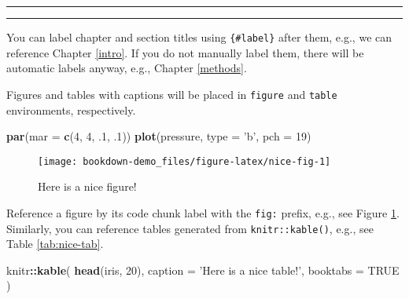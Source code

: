 \documentclass[]{book}
\newenvironment{Shaded}{\begin{snugshade}}{\end{snugshade}}
\newcommand{\DataTypeTok}[1]{\textcolor[rgb]{0.13,0.29,0.53}{#1}}
\newcommand{\DecValTok}[1]{\textcolor[rgb]{0.00,0.00,0.81}{#1}}
\newcommand{\FloatTok}[1]{\textcolor[rgb]{0.00,0.00,0.81}{#1}}
\newcommand{\KeywordTok}[1]{\textcolor[rgb]{0.13,0.29,0.53}{\textbf{#1}}}
\newcommand{\NormalTok}[1]{#1}
\newcommand{\OperatorTok}[1]{\textcolor[rgb]{0.81,0.36,0.00}{\textbf{#1}}}
\newcommand{\OtherTok}[1]{\textcolor[rgb]{0.56,0.35,0.01}{#1}}
\newcommand{\StringTok}[1]{\textcolor[rgb]{0.31,0.60,0.02}{#1}}
\theoremstyle{definition}
\theoremstyle{definition}
\theoremstyle{definition}
\theoremstyle{remark}
\begin{document}
\begin{center}\rule{0.5\linewidth}{\linethickness}\end{center}

\begin{center}\rule{0.5\linewidth}{\linethickness}\end{center}

You can label chapter and section titles using \texttt{\{\#label\}}
after them, e.g., we can reference Chapter \ref{intro}. If you do not
manually label them, there will be automatic labels anyway, e.g.,
Chapter \ref{methods}.

Figures and tables with captions will be placed in \texttt{figure} and
\texttt{table} environments, respectively.

\begin{Shaded}
\begin{Highlighting}[]
\KeywordTok{par}\NormalTok{(}\DataTypeTok{mar =} \KeywordTok{c}\NormalTok{(}\DecValTok{4}\NormalTok{, }\DecValTok{4}\NormalTok{, }\FloatTok{.1}\NormalTok{, }\FloatTok{.1}\NormalTok{))}
\KeywordTok{plot}\NormalTok{(pressure, }\DataTypeTok{type =} \StringTok{'b'}\NormalTok{, }\DataTypeTok{pch =} \DecValTok{19}\NormalTok{)}
\end{Highlighting}
\end{Shaded}

\begin{figure}

{\centering \texttt{[image: bookdown-demo\_files/figure-latex/nice-fig-1]} 

}

\caption{Here is a nice figure!}\label{fig:nice-fig}
\end{figure}

Reference a figure by its code chunk label with the \texttt{fig:}
prefix, e.g., see Figure \ref{fig:nice-fig}. Similarly, you can
reference tables generated from \texttt{knitr::kable()}, e.g., see Table
\ref{tab:nice-tab}.

\begin{Shaded}
\begin{Highlighting}[]
\NormalTok{knitr}\OperatorTok{::}\KeywordTok{kable}\NormalTok{(}
  \KeywordTok{head}\NormalTok{(iris, }\DecValTok{20}\NormalTok{), }\DataTypeTok{caption =} \StringTok{'Here is a nice table!'}\NormalTok{,}
  \DataTypeTok{booktabs =} \OtherTok{TRUE}
\NormalTok{)}
\end{Highlighting}
\end{Shaded}
\end{document}
